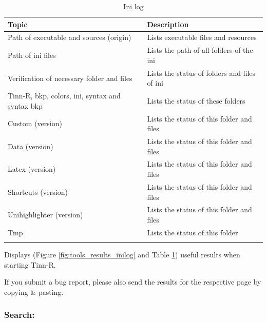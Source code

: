 \begin{table}
  \begin{footnotesize}
    \begin{tabularx}{\textwidth}{XX}\\
      \hline
      \textbf{Topic} & \textbf{Description} \\
      \hline
      Path of executable and sources (origin) & Lists executable files and resources \\
      Path of ini files & Lists the path of all folders of the ini \\
      Verification of necessary folder and files & Lists the status of folders and files of ini \\
      Tinn-R, bkp, colors, ini, syntax and syntax bkp & Lists the status of these folders \\
      Custom (version) & Lists the status of this folder and files \\
      Data (version) & Lists the status of this folder and files \\
      Latex (version) & Lists the status of this folder and files \\
      Shortcuts (version) & Lists the status of this folder and files \\
      Unihighlighter (version) & Lists the status of this folder and files \\
      Tmp & Lists the status of this folder \\
      \hline
      \\
    \end{tabularx}
  \end{footnotesize}
  \caption{Ini log}
  \label{tab:tools_results_inilog}
\end{table}


Displays
(Figure \ref{fig:tools_results_inilog} and
Table \ref{tab:tools_results_inilog})
useful results when starting Tinn-R.

If you submit a bug report, please also send the results for the
respective page by copying \& pasting.


\newpage
\subsubsection{Search:}
\\


